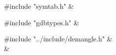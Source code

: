 \medskip
\begin{cxreftabi}
{\stt \#include "symtab.h"} &\\
\end{cxreftabi}

\medskip
\begin{cxreftabi}
{\stt \#include "gdbtypes.h"} &\\
\end{cxreftabi}

\medskip
\begin{cxreftabi}
{\stt \#include "../include/demangle.h"} &\\
\hspace*{0.2in}{\stt \#include "../include/libiberty.h"} &\\
\end{cxreftabi}

